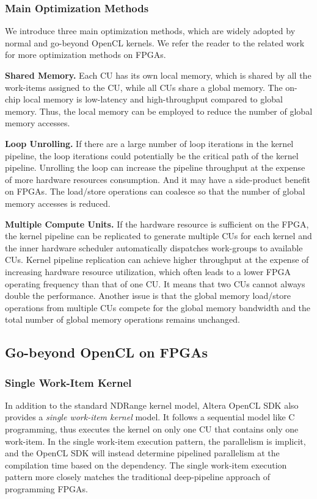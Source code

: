 \subsubsection{Main Optimization Methods}
We introduce three main optimization methods, which are widely adopted by normal and go-beyond OpenCL kernels. We refer the reader to the related work~\cite{fpga_opencl_model_hpca16} for more optimization methods on FPGAs. 

{\bf Shared Memory. } Each CU has its own local memory, which is shared by all the work-items assigned to the CU, while all CUs share a global memory. The on-chip local memory is low-latency and high-throughput compared to global memory. Thus, the local memory can be employed to reduce the number of global memory accesses.

{\bf Loop Unrolling. } If there are a large number of loop iterations in the kernel pipeline, the loop iterations could potentially be the critical path of the kernel pipeline. Unrolling the loop can increase the pipeline throughput at the expense of more hardware resources consumption. And it may have a side-product benefit on FPGAs. The load/store operations can coalesce so that the number of global memory accesses is reduced.

{\bf Multiple Compute Units. } If the hardware resource is sufficient on the FPGA, the kernel pipeline can be replicated to generate multiple CUs for each kernel and the inner hardware scheduler automatically dispatches work-groups to available CUs. Kernel pipeline replication can achieve higher throughput at the expense of increasing hardware resource utilization, which often leads to a lower FPGA operating frequency than that of one CU. It means that two CUs cannot always double the performance. Another issue is that the global memory load/store operations from multiple CUs compete for the global memory bandwidth and the total number of global memory operations remains unchanged.


\subsection{Go-beyond OpenCL on FPGAs}

\subsubsection{Single Work-Item Kernel} 

In addition to the standard NDRange kernel model, Altera OpenCL SDK also provides a \emph{single work-item kernel}  model. It follows a sequential model like C programming, thus executes the kernel on only one CU that contains only one work-item. In the single work-item execution pattern, the parallelism is implicit, and the OpenCL SDK will instead determine pipelined parallelism at the compilation time based on the dependency. The single work-item execution pattern more closely matches the traditional deep-pipeline approach of programming FPGAs.


